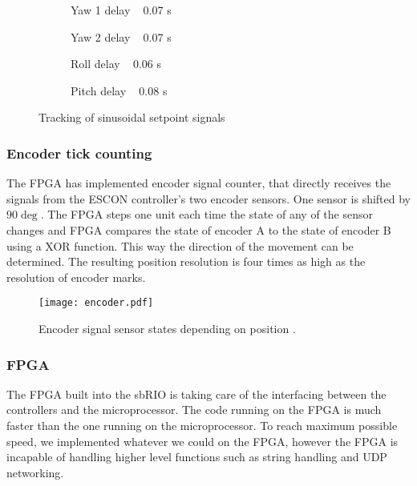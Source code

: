 \begin{figure}[H]
	\begin{subfigure}[b]{0.5\textwidth}
		\centering
		\resizebox{\linewidth}{!}{
			
		}
		\caption{Yaw 1 delay ~ 0.07 s}
	\end{subfigure}
	\begin{subfigure}[b]{0.5\textwidth}
		\centering
		\resizebox{\linewidth}{!}{
			
		}
		\caption{Yaw 2 delay ~ 0.07 s}
	\end{subfigure}
	\begin{subfigure}[b]{0.5\textwidth}
		\centering
		\resizebox{\linewidth}{!}{
			
		}
		\caption{Roll delay ~ 0.06 s}
	\end{subfigure}
	\begin{subfigure}[b]{0.5\textwidth}
		\centering
		\resizebox{\linewidth}{!}{
			
		}
		\caption{Pitch delay ~ 0.08 s}
	\end{subfigure}
	\caption{Tracking of sinusoidal setpoint signals}
	\label{sin_excite}
\end{figure}

\subsubsection{Encoder tick counting}\label{encount}
The FPGA has implemented encoder signal counter, that directly receives the signals from  the ESCON controller's two encoder sensors. One sensor is shifted by $90\deg$. The FPGA steps one unit each time the state of any of the sensor changes and FPGA compares the state of encoder A to the state of encoder B using a XOR function. This way the direction of the movement can be determined. The resulting position resolution is four times as high as the resolution of encoder marks.

\begin{figure}[H]
	\centering
	\texttt{[image: encoder.pdf]}
	\caption{Encoder signal sensor states depending on position \cite{motor_encoder}.}
	\label{fig:encoder}
\end{figure}

\subsubsection{FPGA}

The FPGA built into the sbRIO is taking care of the interfacing between the controllers and the microprocessor. The code running on the FPGA is much faster than the one running on the microprocessor. To reach maximum possible speed, we implemented whatever we could on the FPGA, however the FPGA is incapable of handling higher level functions such as string handling and UDP networking.

